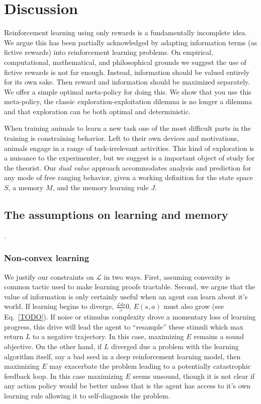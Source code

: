 \documentclass[9pt,twocolumn,twoside]{pnas-new}
\begin{document}
\section{Discussion}
Reinforcement learning using only rewards is a fundamentally incomplete idea. We argue this has been partially acknowledged by adapting information terms (as fictive rewards) into reinforcement learning problems. On empirical, computational, mathematical, and philosophical grounds we suggest the use of fictive rewards is not far enough. Instead, information should be valued entirely for its own sake. Then reward and information should be maximized separately. We offer a simple optimal meta-policy for doing this. We show that you use this meta-policy, the classic exploration-exploitation dilemma is no longer a dilemma and that exploration can be both optimal and deterministic.

When training animals to learn a new task one of the most difficult parts in the training is constraining behavior. Left to their own devices and motivations, animals engage in a range of task-irrelevant activities. This kind of exploration is a nuisance to the experimenter, but we suggest is a important object of study for the theorist. Our \textit{dual value} approach accommodates analysis and prediction for any mode of free ranging behavior, given a working definition for the state space $S$, a memory $M$, and the memory learning rule $J$.

\subsection*{The assumptions on learning and memory}.
\subsubsection{Non-convex learning}
We justify our constraints on $\mathcal{L}$ in two ways. First, assuming convexity is common tactic used to make learning proofs tractable. Second, we argue that the value of information is only certainly useful when an agent can learn about it's world. If learning begins to diverge, $\frac{\mathcal{L}{ds}} > 0$, $E(s, a)$ must also grow (see Eq.~\ref{TODO}). If noise or stimulus complexity drove a momentary loss of learning progress, this drive will lead the agent to ``resample'' these stimuli which max return $L$ to a negative trajectory. In this case, maximizing $E$ remains a sound objective. On the other hand, if $L$ diverged due a problem with the learning algorithm itself, say a bad seed in a deep reinforcement learning model, then maximizing $E$ may exacerbate the problem leading to a potentially catastrophic feedback loop. In this case maximizing $E$ seems unsound, though it is not clear if any action policy would be better unless that is the agent has access to it's own learning rule allowing it to self-diagnosis the problem.
\end{document}
